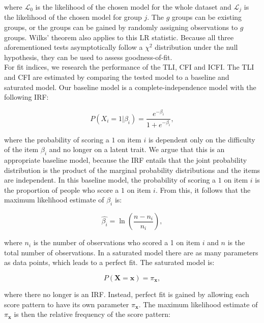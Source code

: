 \documentclass[Royal,sageapa,times,doublespace]{sagej}
\begin{document}
where $\mathcal{L}_0$ is the likelihood of the chosen model for the whole dataset and $\mathcal{L}_j$ is the likelihood of the chosen model for group $j$. The $g$ groups can be existing groups, or the groups can be gained by randomly assigning observations to $g$ groups. Wilks' theorem also applies to this LR statistic. Because all three aforementioned tests asymptotically follow a $\chi^2$ distribution under the null hypothesis, they can be used to assess goodness-of-fit. \\
\indent For fit indices, we research the performance of the TLI, CFI and ICFI. The TLI and CFI are estimated by comparing the tested model to a baseline and saturated model. Our baseline model is a complete-independence model with the following IRF:

\begin{equation}
P(X_i = 1 | \beta_{i}) = \frac{e^{- \beta_{i}}}{1 + e^{- \beta_{i}}},
\end{equation}

where the probability of scoring a $1$ on item $i$ is dependent only on the difficulty of the item $\beta_i$ and no longer on a latent trait. We argue that this is an appropriate baseline model, because the IRF entails that the joint probability distribution is the product of the marginal probability distributions and the items are independent. In this baseline model, the probability of scoring a $1$ on item $i$ is the proportion of people who score a $1$ on item $i$. From this, it follows that the maximum likelihood estimate of $\beta_{i}$ is:

\begin{equation*}
\hat{\beta_{i}} = \ln(\frac{n - n_i}{n_i}), 
\end{equation*}

where $n_i$ is the number of observations who scored a 1 on item $i$ and $n$ is the total number of observations. In a saturated model there are as many parameters as data points, which leads to a perfect fit. The saturated model is:

\begin{equation}
P(\boldsymbol{X} = \boldsymbol{x}) = \pi_{\boldsymbol{x}},
\end{equation}

where there no longer is an IRF. Instead, perfect fit is gained by allowing each score pattern to have its own parameter $\pi_{\boldsymbol{x}}$. The maximum likelihood estimate of $\pi_{\boldsymbol{x}}$ is then the relative frequency of the score pattern:
\end{document}
